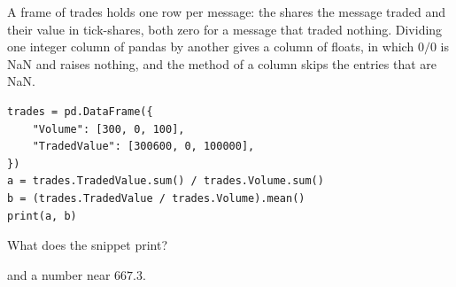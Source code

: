 \begin{question}
\label{question.vwapIsARatioOfSums}
A frame of trades holds one row per message:
the shares the message traded and their value in tick-shares,
both zero for a message that traded nothing.
Dividing one integer column of pandas by another gives a column of floats,
in which $0/0$ is NaN and raises nothing,
and the method  of a column skips the entries that are NaN.
\begin{lstlisting}[caption={A ratio of sums, and a mean of ratios}, label=listing.vwapRatioOfSums]
trades = pd.DataFrame({
    "Volume": [300, 0, 100],
    "TradedValue": [300600, 0, 100000],
})
a = trades.TradedValue.sum() / trades.Volume.sum()
b = (trades.TradedValue / trades.Volume).mean()
print(a, b)
\end{lstlisting}
What does the snippet print?
\begin{choices}
 \choice {}
 \choice {}
 \choice {}
 \choice {} and a number near $667.3$.
 \correctchoice {}
\end{choices}
\end{question}

